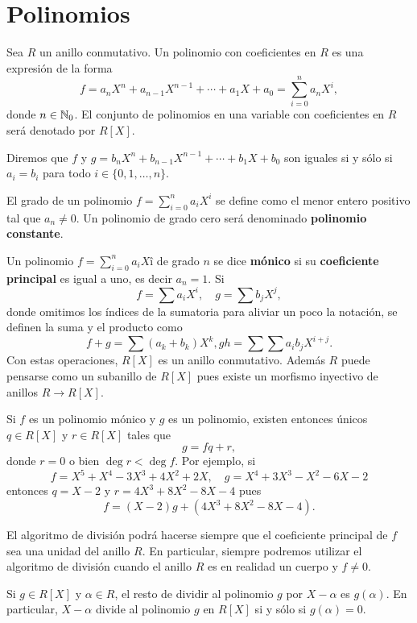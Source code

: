 \chapter{Polinomios}

Sea $R$ un anillo conmutativo. 
Un polinomio con coeficientes en $R$ es una expresión
de la forma
\[
	f=a_nX^n+a_{n-1}X^{n-1}+\cdots+a_1X+a_0=\sum_{i=0}^n a_nX^i,
\]
donde $n\in\mathbb{N}_0$. El conjunto de polinomios en una variable 
con coeficientes en $R$ será denotado por $R[X]$. 

Diremos que $f$ y $g=b_nX^n+b_{n-1}X^{n-1}+\cdots+b_1X+b_0$ son iguales si y
sólo si $ a_i=b_i$ para todo $i\in\{0,1,\dots,n\}$. 

El grado de un polinomio $f=\sum_{i=0}^na_iX^i$ se define como el menor entero positivo tal que $a_n\ne0$. Un polinomio de grado cero
será denominado \textbf{polinomio constante}.

Un polinomio $f=\sum_{i=0}^na_iXî$ de grado $n$ se dice \textbf{mónico} si su \textbf{coeficiente principal} es igual a uno, es decir $a_n=1$.   
Si 
\[
f=\sum a_iX^i,\quad
g=\sum b_jX^j,
\]
donde omitimos los índices de la sumatoria para aliviar un poco la notación, se definen la
suma y el producto como
\[
f+g=\sum (a_k+b_k)X^k,
gh=\sum\sum a_ib_jX^{i+j}.
\]
Con estas operaciones, $R[X]$ es un anillo conmutativo. Además $R$ puede pensarse como un subanillo de $R[X]$ pues
existe un morfismo inyectivo de anillos $R\to R[X]$.  

\begin{example}
Si $f$ es un polinomio mónico y $g$ es un polinomio, existen entonces únicos $q\in R[X]$ y $r\in R[X]$ tales que
\[
g=fq+r,
\]
donde $r=0$ o bien $\deg r<\deg f$. Por ejemplo, si
\[
f=X^5+X^4-3X^3+4X^2+2X,\quad
g=X^4+3X^3-X^2-6X-2
\]
entonces $q=X-2$ y $r=4X^3+8X^2-8X-4$ pues 
\[
f=(X-2)g+(4X^3+8X^2-8X-4).
\]
\end{example}

El algoritmo de división podrá hacerse siempre que el coeficiente principal de $f$ sea una unidad del anillo $R$. En particular, siempre podremos
utilizar el algoritmo de división cuando el anillo $R$ es en realidad un cuerpo y $f\ne 0$.  

\begin{proposition}
Si $g\in R[X]$ y $\alpha\in R$, el resto de dividir al polinomio $g$ por $X-\alpha$ es $g(\alpha)$. En particular, $X-\alpha$ divide al polinomio  
$g$ en $R[X]$ si y sólo si $g(\alpha)=0$. 
\end{proposition}

